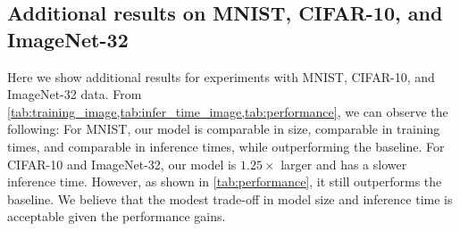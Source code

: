 

\subsection{Additional results on MNIST, CIFAR-10, and ImageNet-32}
\label{sec:add_results}
Here we show additional results for experiments with MNIST, CIFAR-10, and ImageNet-32 data. From \cref{tab:training_image,tab:infer_time_image,tab:performance}, we can observe the following: For MNIST, our model is comparable in size, comparable in training times, and comparable in inference times, while  outperforming the baseline. For CIFAR-10 and ImageNet-32, our model is $1.25\times$ larger and has a slower inference time. However, as shown in \cref{tab:performance}, it still outperforms the baseline. We believe that the modest trade-off in model size and inference time is acceptable given the performance gains.

\begin{table}[t]
\centering
{}
\caption{Computational requirements during training on image datasets. }
\label{tab:training_image}
\end{table}

